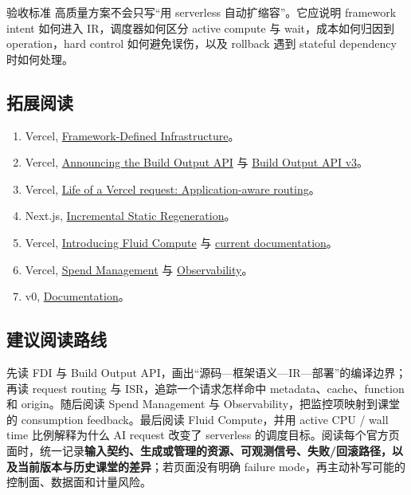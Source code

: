 \documentclass[a4paper]{article}
\begin{document}
\begin{knowledgebox}{验收标准}
高质量方案不会只写“用 serverless 自动扩缩容”。它应说明 framework intent 如何进入 IR，调度器如何区分 active compute 与 wait，成本如何归因到 operation，hard control 如何避免误伤，以及 rollback 遇到 stateful dependency 时如何处理。
\end{knowledgebox}

\subsection{拓展阅读}

\begin{enumerate}
  \item Vercel, \href{https://vercel.com/blog/framework-defined-infrastructure}{Framework-Defined Infrastructure}。
  \item Vercel, \href{https://vercel.com/blog/build-output-api}{Announcing the Build Output API} 与 \href{https://vercel.com/docs/build-output-api/v3}{Build Output API v3}。
  \item Vercel, \href{https://vercel.com/blog/life-of-a-request-application-aware-routing}{Life of a Vercel request: Application-aware routing}。
  \item Next.js, \href{https://nextjs.org/docs/app/guides/incremental-static-regeneration}{Incremental Static Regeneration}。
  \item Vercel, \href{https://vercel.com/blog/introducing-fluid-compute}{Introducing Fluid Compute} 与 \href{https://vercel.com/docs/fluid-compute}{current documentation}。
  \item Vercel, \href{https://vercel.com/docs/spend-management}{Spend Management} 与 \href{https://vercel.com/docs/observability}{Observability}。
  \item v0, \href{https://v0.app/docs}{Documentation}。
\end{enumerate}

\subsection{建议阅读路线}

先读 FDI 与 Build Output API，画出“源码—框架语义—IR—部署”的编译边界；再读 request routing 与 ISR，追踪一个请求怎样命中 metadata、cache、function 和 origin。随后阅读 Spend Management 与 Observability，把监控项映射到课堂的 consumption feedback。最后阅读 Fluid Compute，并用 active CPU / wall time 比例解释为什么 AI request 改变了 serverless 的调度目标。阅读每个官方页面时，统一记录\textbf{输入契约、生成或管理的资源、可观测信号、失败/回滚路径，以及当前版本与历史课堂的差异}；若页面没有明确 failure mode，再主动补写可能的控制面、数据面和计量风险。
\end{document}
